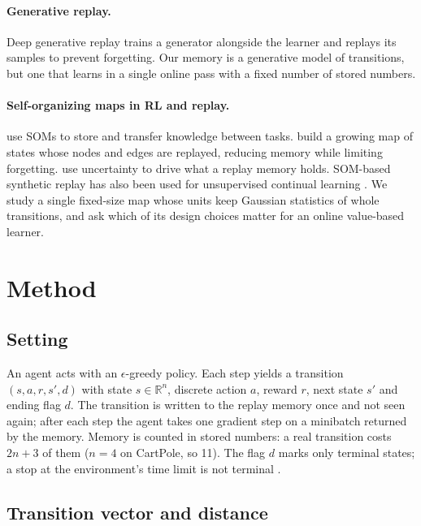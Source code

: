 \documentclass{article}
\begin{document}
\paragraph{Generative replay.} Deep generative replay
\citep{shin2017continual} trains a generator alongside the learner and
replays its samples to prevent forgetting. Our memory is a generative model
of transitions, but one that learns in a single online pass with a fixed
number of stored numbers.

\paragraph{Self-organizing maps in RL and replay.} \citet{karimpanal2019som}
use SOMs to store and transfer knowledge between tasks. \citet{hafez2023map}
build a growing map of states whose nodes and edges are replayed, reducing
memory while limiting forgetting. \citet{rajakrishnan2026uncertainty} use
uncertainty to drive what a replay memory holds. SOM-based synthetic replay
has also been used for unsupervised continual learning
\citep{thapa2026unsupervised}. We study a single fixed-size map whose units
keep Gaussian statistics of whole transitions, and ask which of its design
choices matter for an online value-based learner.

\section{Method}
\label{sec:method}

\subsection{Setting}
\label{sec:setting}

An agent acts with an $\epsilon$-greedy policy. Each step yields a transition
$(s, a, r, s', d)$ with state $s \in \mathbb{R}^{n}$, discrete action $a$,
reward $r$, next state $s'$ and ending flag $d$. The transition is written to
the replay memory once and not seen again; after each step the agent takes
one gradient step on a minibatch returned by the memory. Memory is counted
in stored numbers: a real transition costs $2n + 3$ of them ($n = 4$ on
CartPole, so 11). The flag $d$ marks only terminal states; a stop at the
environment's time limit is not terminal \citep{pardo2018time}.

\subsection{Transition vector and distance}
\label{sec:distance}
\end{document}
